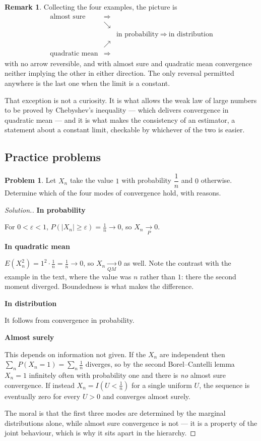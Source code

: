 \documentclass[11pt,a4paper]{article}
\theoremstyle{definition}
\newtheorem*{remark}{Remark}
\newtheorem{problemx}{Problem}[subsection]
\newenvironment{problem}{\begin{problemx}}{\end{problemx}}
\newenvironment{solution}
  {\renewcommand{\qedsymbol}{}\begin{proof}[\textit{Solution}.]}
  {\end{proof}}
\newcommand{\subhead}[1]{%
  \par\medskip\noindent\textbf{#1}\par\nobreak\smallskip}
\begin{document}
\begin{remark}
Collecting the four examples, the picture is
$$\begin{array}{ccc}
\text{almost sure} & \Longrightarrow & \\
 & \searrow & \\
 & & \text{in probability} \ \Longrightarrow\ \text{in distribution}\\
 & \nearrow & \\
\text{quadratic mean} & \Longrightarrow &
\end{array}$$
with no arrow reversible, and with almost sure and quadratic mean convergence
neither implying the other in either direction. The only reversal permitted
anywhere is the last one when the limit is a constant.

That exception is not a curiosity. It is what allows the weak law of large
numbers to be proved by Chebyshev's inequality --- which delivers convergence in
quadratic mean --- and it is what makes the consistency of an estimator, a
statement about a constant limit, checkable by whichever of the two is easier.
\end{remark}




\subsection{Practice problems}

\begin{problem}
Let $X_n$ take the value $1$ with probability $\dfrac1n$ and $0$ otherwise.
Determine which of the four modes of convergence hold, with reasons.
\end{problem}
\begin{solution}
\subhead{In probability}
For $0<\varepsilon<1$, $P\left(\left|X_n\right|\geq\varepsilon\right)
= \tfrac1n\rightarrow0$, so $X_n\underset{P}{\longrightarrow}0$.

\subhead{In quadratic mean}
$E\left(X_n^{2}\right) = 1^{2}\cdot\tfrac1n = \tfrac1n\rightarrow0$, so
$X_n\underset{QM}{\longrightarrow}0$ as well. Note the contrast with the example
in the text, where the value was $n$ rather than $1$: there the second moment
diverged. Boundedness is what makes the difference.

\subhead{In distribution}
It follows from convergence in probability.

\subhead{Almost surely}
This depends on information not given. If the $X_n$ are independent then
$\sum_n P(X_n=1) = \sum_n \tfrac1n$ diverges, so by the second Borel--Cantelli
lemma $X_n=1$ infinitely often with probability one and there is \emph{no}
almost sure convergence. If instead $X_n = I\left(U<\tfrac1n\right)$ for a
single uniform $U$, the sequence is eventually zero for every $U>0$ and
converges almost surely.

The moral is that the first three modes are determined by the marginal
distributions alone, while almost sure convergence is not --- it is a property
of the joint behaviour, which is why it sits apart in the hierarchy.
\end{solution}
\end{document}
